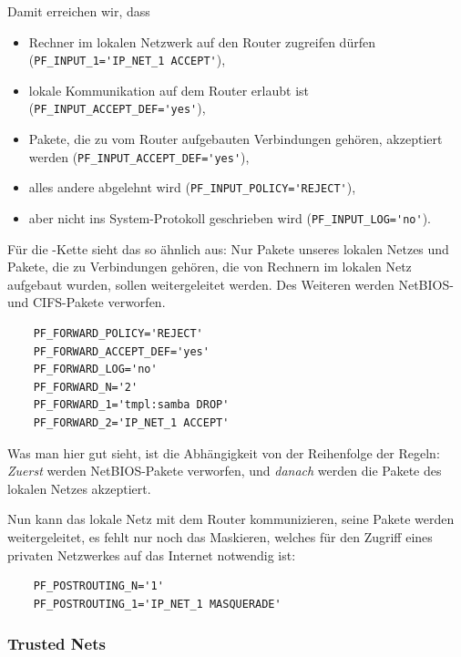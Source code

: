 Damit erreichen wir, dass
\begin{itemize}
\item Rechner im lokalen Netzwerk auf den Router zugreifen dürfen\\
(\verb+PF_INPUT_1='IP_NET_1 ACCEPT'+),
\item lokale Kommunikation auf dem Router erlaubt ist
  (\verb+PF_INPUT_ACCEPT_DEF='yes'+),
\item Pakete, die zu vom Router aufgebauten Verbindungen gehören,
  akzeptiert werden \newline (\verb+PF_INPUT_ACCEPT_DEF='yes'+),
\item alles andere abgelehnt wird (\verb+PF_INPUT_POLICY='REJECT'+),
\item aber nicht ins System-Protokoll geschrieben wird
  (\verb+PF_INPUT_LOG='no'+).
\end{itemize}

Für die -Kette sieht das so ähnlich aus: Nur Pakete unseres
lokalen Netzes und Pakete, die zu Verbindungen gehören, die von
Rechnern im lokalen Netz aufgebaut wurden, sollen weitergeleitet
werden. Des Weiteren werden NetBIOS- und CIFS-Pakete verworfen.

\begin{example}
\begin{verbatim}
    PF_FORWARD_POLICY='REJECT'
    PF_FORWARD_ACCEPT_DEF='yes'
    PF_FORWARD_LOG='no'
    PF_FORWARD_N='2'
    PF_FORWARD_1='tmpl:samba DROP'
    PF_FORWARD_2='IP_NET_1 ACCEPT'
\end{verbatim}
\end{example}

Was man hier gut sieht, ist die Abhängigkeit von der Reihenfolge der
Regeln: \emph{Zuerst} werden NetBIOS-Pakete verworfen, und \emph{danach} werden
die Pakete des lokalen Netzes akzeptiert.

Nun kann das lokale Netz mit dem Router kommunizieren, seine Pakete
werden weitergeleitet, es fehlt nur noch das Maskieren, welches für
den Zugriff eines privaten Netzwerkes auf das Internet notwendig ist:

\begin{example}
\begin{verbatim}
    PF_POSTROUTING_N='1'
    PF_POSTROUTING_1='IP_NET_1 MASQUERADE'
\end{verbatim}
\end{example}

\subsubsection{Trusted Nets}

